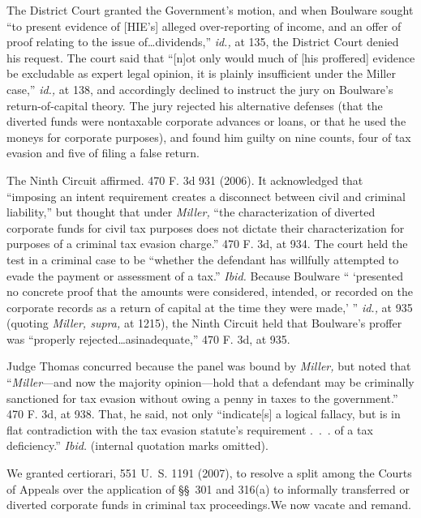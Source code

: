   The District Court granted the Government's motion, and when
Boulware sought ``to present evidence of [HIE's] alleged
over-reporting of income, and an offer of proof relating to the issue
of\dots dividends,'' \emph{id.,} at 135, the District Court
denied his request. The court said that ``[n]ot only would much
of [his proffered] evidence be excludable as expert legal opinion,
it is plainly insufficient under the Miller case,'' \emph{id.,} at
138, and accordingly declined to instruct the jury on Boulware's
return-of-capital theory. The jury rejected his alternative defenses
(that the diverted funds were nontaxable corporate advances or loans, or
that he used the moneys for corporate purposes), and found him guilty on
nine counts, four of tax evasion and five of filing a false return.

  The Ninth Circuit affirmed. 470 F. 3d 931 (2006). It acknowledged
that ``imposing an intent requirement creates a disconnect between
civil and criminal liability,'' but thought that under \emph{Miller,}
``the characterization of diverted corporate funds for civil tax
purposes does not dictate their characterization for purposes of a
criminal tax evasion charge.'' 470 F. 3d, at 934. The court held
the test in a criminal case to be ``whether the defendant has willfully
attempted to evade the payment or assessment of a tax.'' \emph{Ibid.}
Because Boulware `` ‘presented no concrete proof that the amounts
were considered, intended, or recorded on the corporate rec\newpage ords
as a return of capital at the time they were made,' '' \emph{id.,} at
935 (quoting \emph{Miller, supra,} at 1215), the Ninth Circuit held that
Boulware's proffer was ``properly rejected\dots asinadequate,''
470 F. 3d, at 935.

  Judge Thomas concurred because the panel was bound by \emph{Miller,}
but noted that ``\emph{Miller}---and now the majority opinion---hold
that a defendant may be criminally sanctioned for tax evasion without
owing a penny in taxes to the government.'' 470 F. 3d, at 938.
That, he said, not only ``indicate[s] a logical fallacy, but is
in flat contradiction with the tax evasion statute's requirement
.~.~. of a tax deficiency.'' \emph{Ibid.} (internal quotation marks
omitted).\footnotemark[5]

  We granted certiorari, 551 U.~S. 1191 (2007), to resolve a split
among the Courts of Appeals over the application of \S\S~301 and 316(a)
to informally transferred or diverted corporate funds in criminal tax
proceedings.\footnotemark[6] We now vacate and remand.

